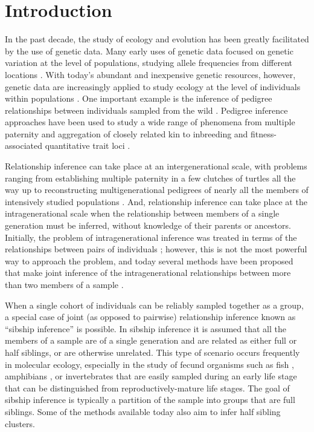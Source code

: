 
\section*{Introduction}

In the past decade, the study of ecology and evolution has been greatly facilitated by the use of genetic 
data.  Many early uses of genetic data focused on genetic variation at the level of populations, 
studying allele frequencies from different locations \citep{neigel97}. With today's abundant and 
inexpensive genetic resources, however, genetic data are increasingly applied to study ecology at the 
level of individuals within populations \citep{Pea&Cra2004,Maneletal2005}. One important example is the 
inference of pedigree relationships between individuals sampled from the wild 
\citep{blouin03,Pemberton2008}. Pedigree inference approaches have been used to study a wide range of 
phenomena from multiple paternity \citep{Sogardetal2005} and aggregation of closely related kin 
\citep{Fraseretal2005}  to inbreeding \citep{Marshalletal2002} and fitness-associated quantitative 
trait loci \citep{beraldi07}. 

Relationship inference can take place at an intergenerational scale, with problems ranging from 
establishing multiple paternity in a few clutches of turtles \citep{Pea&Avi2001} all the way up to 
reconstructing multigenerational pedigrees of nearly all the members of intensively studied populations 
\citep{Robinsonetal2006,Dunnetal2011}.  And, relationship inference can take place at the intragenerational scale when the relationship between members of a single generation must be inferred, 
without knowledge of their parents or ancestors.  Initially, the problem of intragenerational inference 
was treated in terms of the relationships between pairs of individuals \citep{Thompson1975}; 
however, this is not the most powerful way to approach the problem, and today several methods have been 
proposed that make joint inference of the intragenerational relationships between more than two members 
of a sample \citep{painter97,almudevar99,Siebertsetal02,Wang2007_triadic}.  

When a single cohort of individuals can be reliably sampled together as a group, a special case of 
joint (as opposed to pairwise) relationship inference known as ``sibship inference'' is possible.  In 
sibship inference it is assumed that all the members of a sample are of a single generation and are 
related as either full or half siblings, or are otherwise unrelated. This type of scenario occurs 
frequently in molecular ecology, especially in the study of fecund organisms such as fish 
\citep{And&Dun2008}, amphibians \citep{Halversonetal2006}, or invertebrates \citep{read12} that are 
easily sampled during an early life stage that can be distinguished from reproductively-mature life 
stages.  The goal of sibship inference is typically a partition of the sample into groups that are full 
siblings. Some of the methods available today also aim to infer half sibling clusters.  

